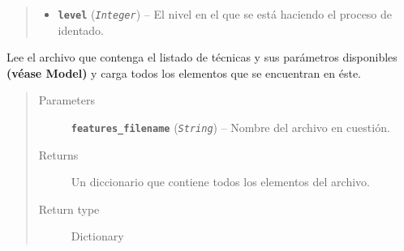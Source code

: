\documentclass[letterpaper,10pt,english]{sphinxmanual}
\begin{document}
\begin{fulllineitems}
\begin{fulllineitems}
\begin{quote}
\begin{description}
\begin{itemize}
\item {} 
\textbf{\texttt{level}} (\emph{\texttt{Integer}}) -- El nivel en el que se está haciendo 
el proceso de identado.

\end{itemize}

\end{description}\end{quote}

\end{fulllineitems}


\begin{fulllineitems}
\label{Controller/XMLParser:Controller.XMLParser.XMLParser.load_xml_features}
Lee el archivo que contenga el listado de técnicas 
y sus parámetros disponibles \textbf{(véase Model)} y 
carga todos los elementos que se encuentran en éste.
\begin{quote}\begin{description}
\item[{Parameters}] \leavevmode
\textbf{\texttt{features\_filename}} (\emph{\texttt{String}}) -- Nombre del archivo en cuestión.

\item[{Returns}] \leavevmode
Un diccionario que contiene todos los elementos
del archivo.

\item[{Return type}] \leavevmode
Dictionary

\end{description}\end{quote}

\end{fulllineitems}



\end{fulllineitems}
\end{document}
